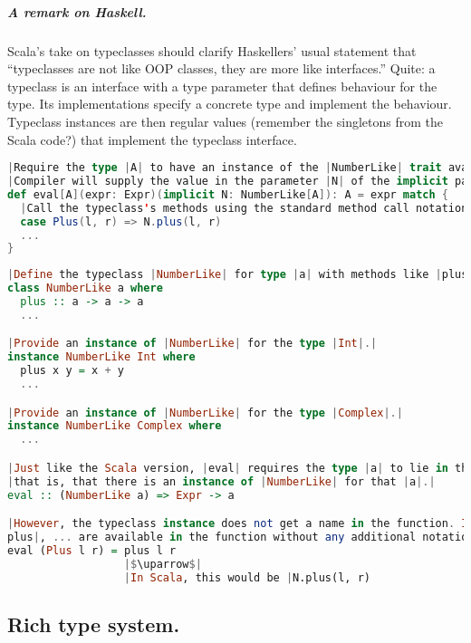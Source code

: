 \documentclass[10 pt]{article}
\begin{document}
\subparagraph{A remark on Haskell.} Scala's take on typeclasses should clarify Haskellers' usual statement that ``typeclasses are not like OOP classes, they are more like interfaces.'' Quite: a typeclass is an interface with a type parameter that defines behaviour for the type. Its implementations specify a concrete type and implement the behaviour. Typeclass instances are then regular values (remember the singletons from the Scala code?) that implement the typeclass interface.

\begin{lstlisting}[language=Scala, escapechar=|]
|Require the type |A| to have an instance of the |NumberLike| trait available for it.|
|Compiler will supply the value in the parameter |N| of the implicit parameter list.|
def eval[A](expr: Expr)(implicit N: NumberLike[A]): A = expr match {
  |Call the typeclass's methods using the standard method call notation.|
  case Plus(l, r) => N.plus(l, r)
  ...
}
\end{lstlisting}
\begin{lstlisting}[language=Haskell, escapechar=|]
|Define the typeclass |NumberLike| for type |a| with methods like |plus|, ... .|
class NumberLike a where
  plus :: a -> a -> a
  ...

|Provide an instance of |NumberLike| for the type |Int|.|
instance NumberLike Int where
  plus x y = x + y
  ...

|Provide an instance of |NumberLike| for the type |Complex|.|
instance NumberLike Complex where
  ...

|Just like the Scala version, |eval| requires the type |a| to lie in the |NumberLike| typeclass;|
|that is, that there is an instance of |NumberLike| for that |a|.|
eval :: (NumberLike a) => Expr -> a

|However, the typeclass instance does not get a name in the function. Instead, all its functions|
plus|, ... are available in the function without any additional notation.|
eval (Plus l r) = plus l r
                  |$\uparrow$|
                  |In Scala, this would be |N.plus(l, r)
\end{lstlisting}

\subsection{Rich type system.}
\end{document}
